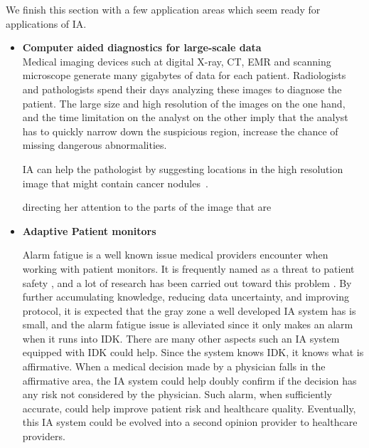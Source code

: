 \documentclass[11pt]{pnas-new}
\begin{document}


  
  We finish this section with a few application areas which seem ready
  for applications of IA.
  
\begin{itemize}
\item{\bf Computer aided diagnostics for large-scale data}\\
  Medical imaging devices such at digital X-ray, CT, EMR and scanning
  microscope generate many gigabytes of data for each
  patient. Radiologists and pathologists spend their days analyzing
  these images to diagnose the patient. The large size and high
  resolution of the images on the one hand, and the time limitation on
  the analyst on the other imply that the analyst has to quickly
  narrow down the suspicious region, increase the chance of missing
  dangerous abnormalities.

  IA can help the pathologist by suggesting locations in the high
  resolution image that might contain cancer nodules~\cite{}.

  directing her attention to the
  parts of the image that are 

\item{\bf Adaptive Patient monitors}

{\color{blue}Alarm fatigue is a well known issue medical providers encounter when working with patient monitors. It is frequently named as a threat to patient safety \cite{sendelbach2013alarm,ruskin2015alarm}, and a lot of research has been carried out toward this problem \cite{cvach2012monitor,paine2016systematic,bai2016sequence,hu2019algorithm}. By further accumulating knowledge, reducing data uncertainty, and improving protocol, it is expected that the gray zone a well developed IA system has is small, and the alarm fatigue issue is alleviated since it only makes an alarm when it runs into IDK. There are many other aspects such an IA system equipped with IDK could help. Since the system knows IDK, it knows what is affirmative. When a medical decision made by a physician falls in the affirmative area, the IA system could help doubly confirm if the decision has any risk not considered by the physician. Such alarm, when sufficiently accurate, could help improve patient risk and healthcare quality. Eventually, this IA system could be evolved into a second opinion provider to healthcare providers. 
}



\end{itemize}
\end{document}

